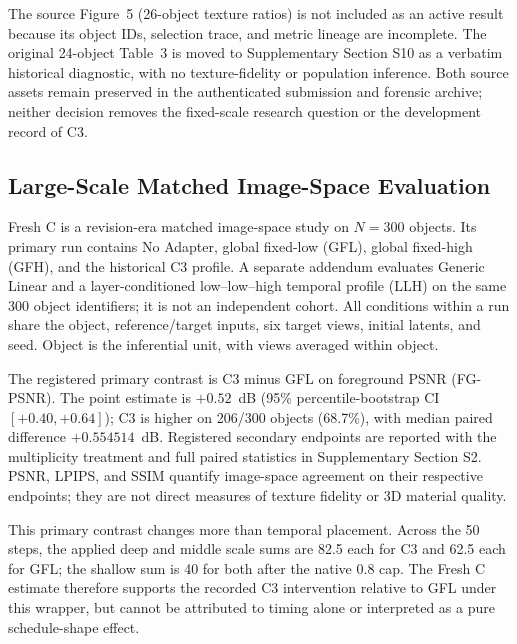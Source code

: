 \documentclass[times,twocolumn,final]{elsarticle}
\providecommand{\DIFadd}[1]{{\protect\color{blue} \sf #1}} %
\providecommand{\DIFaddbegin}{} %
\providecommand{\DIFaddend}{} %
\begin{document}
\DIFadd{The source Figure~5 (26-object texture ratios) is not included as an active result because its object IDs, selection trace, and metric lineage are incomplete. The original }\DIFaddend 24-object   \DIFaddbegin \DIFadd{Table~3 is moved to Supplementary Section S10 as a verbatim historical diagnostic, with no texture-fidelity or population inference. Both source assets remain preserved in the authenticated submission and forensic archive; neither decision removes the fixed-scale research question or the development record of C3.
}

\subsection{Large-Scale Matched Image-Space Evaluation}
\label{subsec:largescale}

\DIFadd{Fresh C is a revision-era matched image-space study on $N=300$ objects. Its primary run contains No Adapter, global fixed-low (GFL), global fixed-high (GFH), and the historical C3 profile. A separate addendum evaluates Generic Linear and a layer-conditioned low--low--high temporal profile (LLH) on the same 300 object identifiers; it is not an independent cohort. All conditions within a run share the object, reference/target inputs, six target views, initial latents, and seed. Object is the inferential unit, with views averaged within object.
}

\DIFadd{The registered primary contrast is C3 minus GFL on foreground PSNR (FG-PSNR). The point estimate is $+0.52$~dB (95\% percentile-bootstrap CI $[+0.40,+0.64]$); C3 is higher on 206/300 objects (68.7\%), with median paired difference $+0.554514$~dB. Registered secondary endpoints are reported with the multiplicity treatment and full paired statistics in Supplementary Section S2. PSNR, LPIPS, and SSIM quantify image-space agreement on their respective endpoints; they are not direct measures of texture fidelity or }\DIFaddend 3D   \DIFaddbegin \DIFadd{material quality.
}

\DIFadd{This primary contrast changes more than temporal placement. Across the 50 steps, the applied deep and middle scale sums are 82.5 each for C3 and 62.5 each for GFL; the shallow sum is 40 for both after the native 0.8 cap. The Fresh C estimate therefore supports the recorded C3 intervention relative to GFL under this wrapper, but cannot be attributed to timing alone or interpreted as a pure schedule-shape effect.
}
\end{document}
